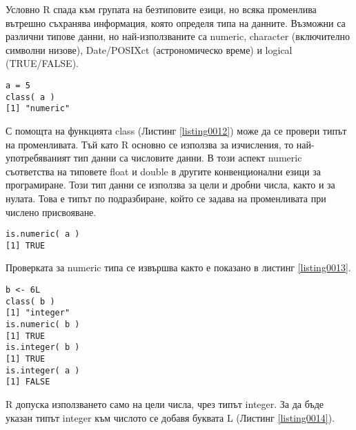 Условно R спада към групата на безтиповите езици, но всяка променлива вътрешно съхранява информация, която определя типа на данните. Възможни са различни типове данни, но най-използваните са numeric, character (включително символни низове), Date/POSIXct (астрономическо време) и logical (TRUE/FALSE). 

\begin{lstlisting}[caption=Проверка за типа на променливата, label=listing0012]
a = 5
class( a )
[1] "numeric"
\end{lstlisting}

С помощта на функцията class (Листинг \ref{listing0012}) може да се провери типът на променливата. Тъй като R основно се използва за изчисления, то най-употребяваният тип данни са числовите данни. В този аспект numeric съответства на типовете float и double в другите конвенционални езици за програмиране. Този тип данни се използва за цели и дробни числа, както и за нулата. Това е типът по подразбиране, който се задава на променливата при числено присвояване. 

\begin{lstlisting}[caption=Проверка за типа numeric, label=listing0013]
is.numeric( a )
[1] TRUE
\end{lstlisting}

Проверката за numeric типа се извършва както е показано в листинг \ref{listing0013}.

\begin{lstlisting}[caption=Използване на целочислен тип, label=listing0014]
b <- 6L
class( b )
[1] "integer"
is.numeric( b )
[1] TRUE
is.integer( b )
[1] TRUE
is.integer( a )
[1] FALSE
\end{lstlisting}

R допуска използването само на цели числа, чрез типът integer. За да бъде указан типът integer към числото се добавя буквата L (Листинг \ref{listing0014}).
